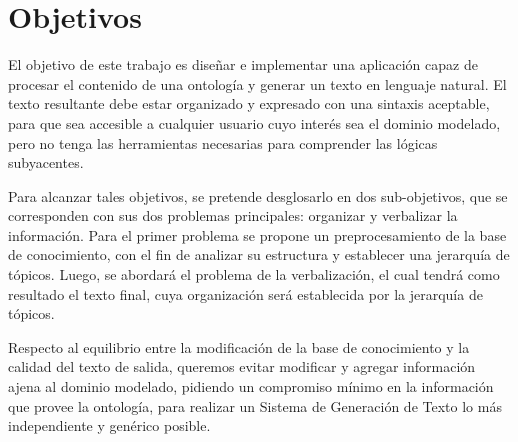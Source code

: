 \documentclass[11pt,a4paper,spanish]{book}
\begin{document}
\section{Objetivos}\label{Intro:objetivo}
El objetivo de este trabajo es diseñar e implementar una aplicación capaz de procesar el contenido de una ontología y generar un texto en lenguaje natural. El texto resultante debe estar organizado y  expresado con una sintaxis aceptable, para que sea accesible a cualquier usuario cuyo interés sea el dominio modelado, pero no tenga las herramientas necesarias para comprender las lógicas subyacentes.

Para alcanzar tales objetivos, se pretende desglosarlo en dos sub-objetivos, que se corresponden con sus dos problemas principales: organizar y verbalizar la información. Para el primer problema se propone un preprocesamiento de la base de conocimiento, con el fin de analizar su estructura y establecer una jerarquía de tópicos. Luego, se abordará el problema de la verbalización, el cual tendrá como resultado el texto final, cuya organización será establecida por la jerarquía de tópicos.

Respecto al equilibrio entre la modificación de la base de conocimiento y la calidad del texto de salida, queremos evitar modificar y agregar información ajena al dominio modelado, pidiendo un compromiso mínimo en la información que provee la ontología, para realizar un Sistema de Generación de Texto lo más independiente y genérico posible.

\end{document}
